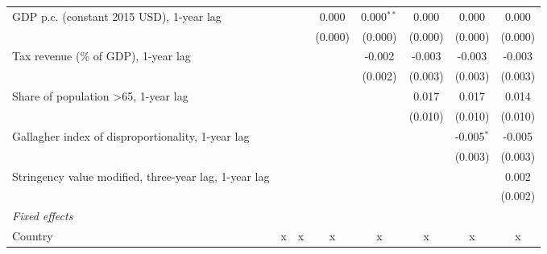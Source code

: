 \begin{table}[htbp]
\begin{tabular}{lccccccc}
      GDP p.c. (constant 2015 USD), 1-year lag                                          &              &              & 0.000         & 0.000$^{**}$  & 0.000          & 0.000          & 0.000\\   
                                                                                        &              &              & (0.000)       & (0.000)       & (0.000)        & (0.000)        & (0.000)\\   
      Tax revenue (\% of GDP), 1-year lag                                               &              &              &               & -0.002        & -0.003         & -0.003         & -0.003\\   
                                                                                        &              &              &               & (0.002)       & (0.003)        & (0.003)        & (0.003)\\   
      Share of population >65, 1-year lag                                               &              &              &               &               & 0.017          & 0.017          & 0.014\\   
                                                                                        &              &              &               &               & (0.010)        & (0.010)        & (0.010)\\   
      Gallagher index of disproportionality, 1-year lag                                 &              &              &               &               &                & -0.005$^{*}$   & -0.005\\   
                                                                                        &              &              &               &               &                & (0.003)        & (0.003)\\   
      Stringency value modified, three-year lag, 1-year lag                             &              &              &               &               &                &                & 0.002\\   
                                                                                        &              &              &               &               &                &                & (0.002)\\   
      \emph{Fixed effects}\\
      Country                                                                           & x            & x            & x             & x             & x              & x              & x\\  

\end{tabular}
\end{table}
